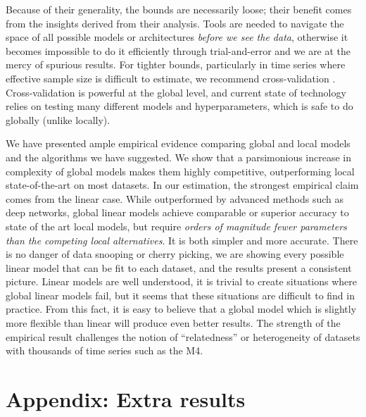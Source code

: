 \documentclass[a4paper]{article}
\theoremstyle{custom}
\begin{document}
Because of their generality, the bounds are necessarily loose; their benefit comes from the insights derived from their analysis.
Tools are needed to navigate the space of all possible models or architectures \textit{before we see the data}, otherwise it becomes impossible to do it efficiently through trial-and-error and we are at the mercy of spurious results.
For tighter bounds, particularly in time series where effective sample size is difficult to estimate, we recommend cross-validation \cite{tscv}.
Cross-validation is powerful at the global level, and current state of technology relies on testing many different models and hyperparameters, which is safe to do globally (unlike locally).

We have presented ample empirical evidence comparing global and local models and the algorithms we have suggested.
We show that a parsimonious increase in complexity of global models makes them highly competitive, outperforming local state-of-the-art on most datasets.
In our estimation, the strongest empirical claim comes from the linear case.
 While outperformed by advanced methods such as deep networks, global linear models achieve comparable or superior accuracy to state of the art local models, but require \textit{orders of magnitude fewer parameters than the competing local alternatives}.
It is both simpler and more accurate.
There is no danger of data snooping or cherry picking, we are showing every possible linear model that can be fit to each dataset, and the results present a consistent picture.
Linear models are well understood, it is trivial to create situations where global linear models fail, but it seems that these situations are difficult to find in practice.
From this fact, it is easy to believe that a global model which is slightly more flexible than linear will produce even better results.
The strength of the empirical result challenges the notion of ``relatedness'' or heterogeneity of datasets with thousands of time series such as the M4.



\clearpage

\appendix
\section{Appendix: Extra results}
\end{document}
